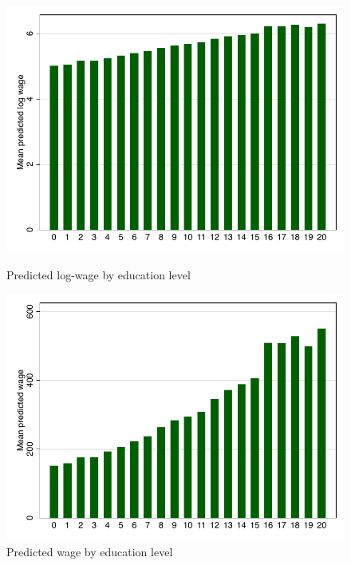 \documentclass{article}
\begin{document}
\begin{figure}
\centering
  \begin{minipage}[b]{0.48\textwidth}
    \includegraphics[width=\textwidth]{../Figures/logwage_ols.pdf}
    \caption{Predicted log-wage by education level}
    \label{fig:1}
  \end{minipage}
  \begin{minipage}[b]{0.48\textwidth}
    \includegraphics[width=\textwidth]{../Figures/wage_ols.pdf}
    \caption{Predicted wage by education level}
    \label{fig:2}
  \end{minipage}
\end{figure}
\end{document}
